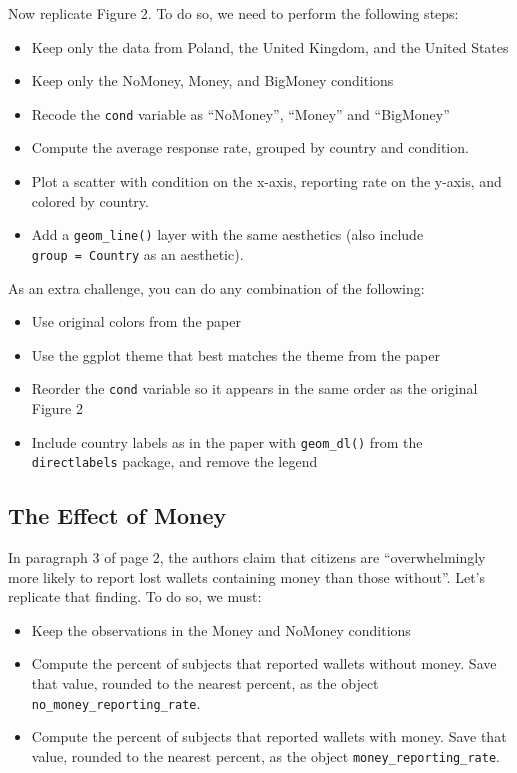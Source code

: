 \documentclass[12pt,halfline,a4paper,]{ouparticle}
\providecommand{\tightlist}{%
  \setlength{\itemsep}{0pt}\setlength{\parskip}{0pt}}
\begin{document}
Now replicate Figure 2. To do so, we need to perform the following
steps:

\begin{itemize}
\tightlist
\item
  Keep only the data from Poland, the United Kingdom, and the United
  States
\item
  Keep only the NoMoney, Money, and BigMoney conditions
\item
  Recode the \texttt{cond} variable as ``NoMoney'', ``Money'' and
  ``BigMoney''
\item
  Compute the average response rate, grouped by country and condition.
\item
  Plot a scatter with condition on the x-axis, reporting rate on the
  y-axis, and colored by country.
\item
  Add a \texttt{geom\_line()} layer with the same aesthetics (also
  include \texttt{group\ =\ Country} as an aesthetic).
\end{itemize}

\noindent As an extra challenge, you can do any combination of the
following:

\begin{itemize}
\tightlist
\item
  Use original colors from the paper
\item
  Use the ggplot theme that best matches the theme from the paper
\item
  Reorder the \texttt{cond} variable so it appears in the same order as
  the original Figure 2
\item
  Include country labels as in the paper with \texttt{geom\_dl()} from
  the \texttt{directlabels} package, and remove the legend
\end{itemize}

\hypertarget{the-effect-of-money}{%
\subsection{The Effect of Money}\label{the-effect-of-money}}

In paragraph 3 of page 2, the authors claim that citizens are
``overwhelmingly more likely to report lost wallets containing money
than those without''. Let's replicate that finding. To do so, we must:

\begin{itemize}
\tightlist
\item
  Keep the observations in the Money and NoMoney conditions
\item
  Compute the percent of subjects that reported wallets without money.
  Save that value, rounded to the nearest percent, as the object
  \texttt{no\_money\_reporting\_rate}.
\item
  Compute the percent of subjects that reported wallets with money. Save
  that value, rounded to the nearest percent, as the object
  \texttt{money\_reporting\_rate}.
\end{itemize}
\end{document}
